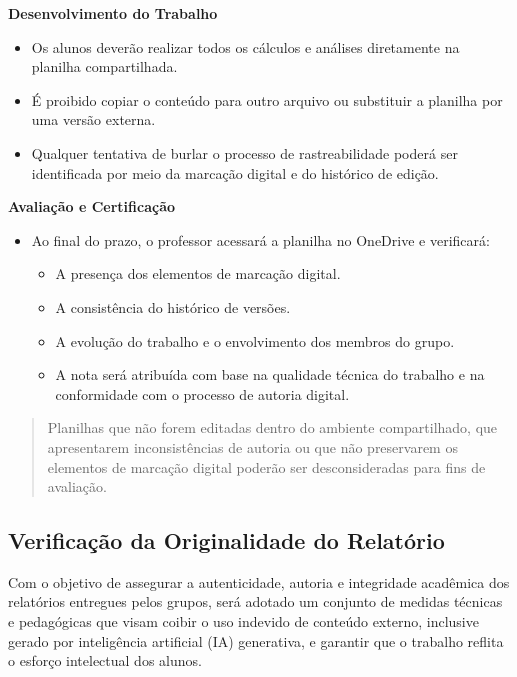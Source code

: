 \documentclass[
  a4paper,
]{book}
\providecommand{\tightlist}{%
  \setlength{\itemsep}{0pt}\setlength{\parskip}{0pt}}\usepackage{longtable,booktabs,array}
\begin{document}
\textbf{Desenvolvimento do Trabalho}

\begin{itemize}
\item
  Os alunos deverão realizar todos os cálculos e análises diretamente na
  planilha compartilhada.
\item
  É proibido copiar o conteúdo para outro arquivo ou substituir a
  planilha por uma versão externa.
\item
  Qualquer tentativa de burlar o processo de rastreabilidade poderá ser
  identificada por meio da marcação digital e do histórico de edição.
\end{itemize}

\textbf{Avaliação e Certificação}

\begin{itemize}
\item
  Ao final do prazo, o professor acessará a planilha no OneDrive e
  verificará:

  \begin{itemize}
  \tightlist
  \item
    A presença dos elementos de marcação digital.
  \item
    A consistência do histórico de versões.
  \item
    A evolução do trabalho e o envolvimento dos membros do grupo.
  \item
    A nota será atribuída com base na qualidade técnica do trabalho e na
    conformidade com o processo de autoria digital.
  \end{itemize}
\end{itemize}

\begin{quote}
Planilhas que não forem editadas dentro do ambiente compartilhado, que
apresentarem inconsistências de autoria ou que não preservarem os
elementos de marcação digital poderão ser desconsideradas para fins de
avaliação.
\end{quote}

\subsection{Verificação da Originalidade do Relatório
📝}\label{verificauxe7uxe3o-da-originalidade-do-relatuxf3rio}

Com o objetivo de assegurar a autenticidade, autoria e integridade
acadêmica dos relatórios entregues pelos grupos, será adotado um
conjunto de medidas técnicas e pedagógicas que visam coibir o uso
indevido de conteúdo externo, inclusive gerado por inteligência
artificial (IA) generativa, e garantir que o trabalho reflita o esforço
intelectual dos alunos.
\end{document}
